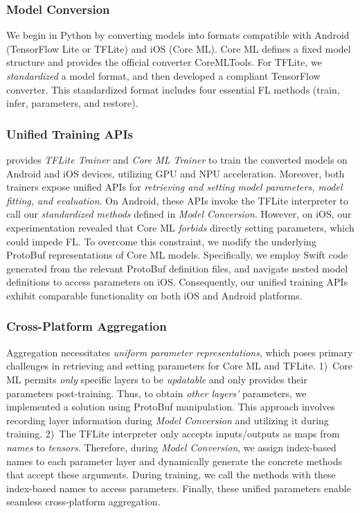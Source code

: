 \documentclass[conference]{IEEEtran}
\begin{document}
\subsubsection{Model Conversion}
We begin in Python by converting models into formats compatible with
Android (TensorFlow Lite or TFLite) and iOS (Core ML).
Core ML defines a fixed model structure and provides
the official converter CoreMLTools.
For TFLite, we \textit{standardized} a model format, and then
developed a compliant TensorFlow converter.
This standardized format includes
four essential FL methods
(\textsf{train}, \textsf{infer}, \textsf{parameters},
and \textsf{restore}).


\subsubsection{Unified Training APIs}
\FedKit{} provides \textit{TFLite Trainer} and \textit{Core ML Trainer} to
train the converted models on Android and iOS devices,
utilizing GPU and NPU acceleration.
Moreover, both trainers expose unified APIs for
\textit{retrieving and setting model parameters,
    model fitting, and evaluation}.
On Android, these APIs invoke the TFLite interpreter to call
our \textit{standardized methods} defined in \textit{Model Conversion}.
However, on iOS, our experimentation revealed that
Core ML \textit{forbids} directly setting parameters, which could impede FL.
To overcome this constraint,
we modify the underlying ProtoBuf representations of
Core ML models.
Specifically,
we employ Swift code generated from the relevant ProtoBuf definition files,
and navigate nested model definitions to access parameters on iOS.
Consequently, our unified training APIs exhibit comparable functionality on
both iOS and Android platforms.


\subsubsection{Cross-Platform Aggregation}
Aggregation necessitates
\textit{uniform parameter representations},
which poses primary challenges in
retrieving and setting parameters for Core ML and TFLite.
1)~Core ML permits \textit{only} specific layers to be \textit{updatable} and
only provides their parameters post-training.
Thus, to obtain \textit{other layers'} parameters,
we implemented a solution using ProtoBuf manipulation.
This approach involves recording layer information
during \textit{Model Conversion} and
utilizing it during training.
2)~The TFLite interpreter only accepts inputs/outputs as maps from
\textit{names} to \textit{tensors}.
Therefore, during \textit{Model Conversion},
we assign index-based names to each parameter layer and
dynamically generate the concrete methods that accept these arguments.
During training, we call the methods with these index-based names to
access parameters.
Finally, these unified parameters enable seamless cross-platform aggregation.
\end{document}

